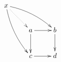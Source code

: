 \documentclass[border=1pt]{standalone}
\begin{document}
$
\xymatrix{
  x \ar@/_/[ddr] \ar@/^/[rrd] \ar@{..>}[rd] & & \\
  & a \ar[r] \ar[d] & b \ar[d] \\
  & c \ar[r] & d
}
$
\end{document}
